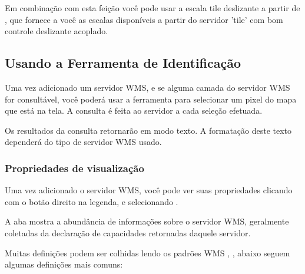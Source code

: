 Em combinação com esta feição você pode usar a escala tile deslizante a partir de   \arrow {}, que fornece a você as escalas disponíveis a partir do servidor 'tile' com bom controle deslizante acoplado.

%
%
\subsection{Usando a Ferramenta de Identificação}\label{sec:ogc-wms-identify}

Uma vez adicionado um servidor WMS, e se alguma camada do servidor WMS for consultável, você poderá usar a ferramenta  para selecionar um pixel do mapa que está na tela. A consulta é feita ao servidor a cada seleção efetuada.

Os resultados da consulta retornarão em modo texto. A formatação deste texto dependerá do tipo de servidor WMS usado.


\subsubsection{Propriedades de visualização}\label{sec:ogc-wms-properties}

Uma vez adicionado o servidor WMS, você pode ver suas propriedades clicando com o botão direito na legenda, e selecionando .


\label{sec:ogc-wms-properties-metadata}

A aba  mostra a abundância de informações sobre o servidor WMS, geralmente coletadas da declaração de capacidades retornadas daquele servidor.

Muitas definições podem ser colhidas lendo os padrões WMS \cite{OGCWMS010101web}, \cite{OGCWMS010300web}, abaixo seguem algumas definições mais comuns:

